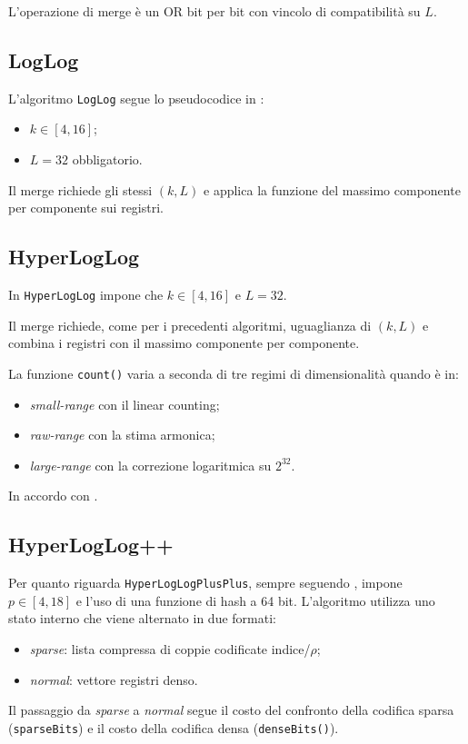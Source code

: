 L'operazione di merge è un OR bit per bit con vincolo di compatibilità su \(L\).

\subsection{LogLog}

L'algoritmo \texttt{LogLog} segue lo pseudocodice in \cite{Durand_Flajolet_2003}:
\begin{itemize}
    \item \(k \in [4,16]\);
    \item \(L = 32\) obbligatorio.
\end{itemize}
Il merge richiede gli stessi \((k,L)\) e applica la funzione del massimo componente per componente
sui registri.

\subsection{HyperLogLog}

In \cite{Flajolet_Fusy_Gandouet_Meunier_2007} \texttt{HyperLogLog} impone che
\(k \in [4,16]\) e \(L=32\). 

Il merge richiede, come per i precedenti algoritmi, uguaglianza di
\((k,L)\) e combina i registri con il massimo componente per componente.

La funzione \texttt{count()} varia a seconda di tre regimi di dimensionalità quando è in:
\begin{itemize}
    \item \emph{small-range} con il linear counting;
    \item \emph{raw-range} con la stima armonica;
    \item \emph{large-range} con la correzione logaritmica su \(2^{32}\).
\end{itemize}
In accordo con \cite{Flajolet_Fusy_Gandouet_Meunier_2007}.

\subsection{HyperLogLog++}
Per quanto riguarda \texttt{HyperLogLogPlusPlus}, sempre seguendo \cite{Heule_Nunkesser_Hall_2013},
impone \(p \in [4,18]\) e l'uso di una funzione di hash a 64 bit.
L'algoritmo utilizza uno stato interno che viene alternato in due formati:
\begin{itemize}
    \item \emph{sparse}: lista compressa di coppie codificate indice/\(\rho\);
    \item \emph{normal}: vettore registri denso.
\end{itemize}
Il passaggio da \emph{sparse} a \emph{normal} segue il costo del confronto della 
codifica sparsa (\texttt{sparseBits}) e 
il costo della codifica densa (\texttt{denseBits()}). 

